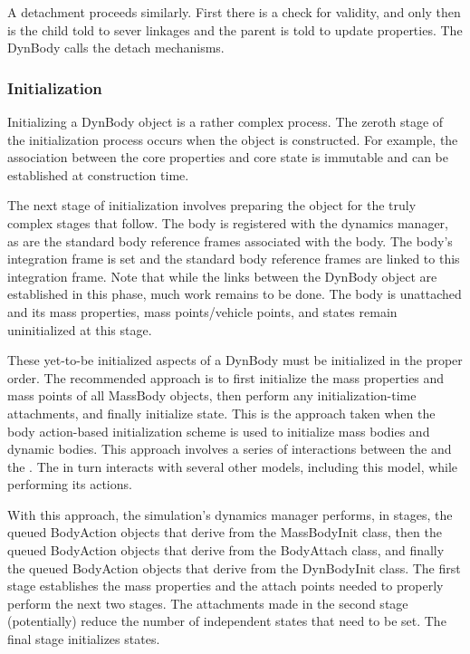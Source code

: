 A detachment proceeds similarly. First there is a check for validity,
and only then is the child told to sever linkages and the parent is told
to update properties. The DynBody calls the \MASS detach mechanisms.

\subsubsection{Initialization}\label{sec:key_initialization}
Initializing a DynBody object is a rather complex process. The zeroth stage
of the initialization process occurs when the object is constructed.
For example, the association between the core properties and core state is
immutable and can be established at construction time.

The next stage of initialization involves preparing the object for the truly
complex stages that follow. The body is registered with the dynamics manager,
as are the standard body reference frames associated with the body. The
body's integration frame is set and the standard body reference frames are
linked to this integration frame. Note that while the links between the
DynBody object are established in this phase, much work remains to be done.
The body is unattached and its mass properties, mass points/vehicle points, and
states remain uninitialized at this stage.

These yet-to-be initialized aspects of a DynBody must be initialized in the
proper order. The recommended approach is to first initialize the mass
properties and mass points of all MassBody objects, then perform any
initialization-time attachments, and finally initialize state. This is
the approach taken when the body action-based initialization scheme is used
to initialize mass bodies and dynamic bodies.
This approach involves a series of interactions
between the  and the .
The \BODYACTION in turn interacts with
several other models, including this model, while performing its actions.

With this approach, the simulation's dynamics manager performs, in stages,
the queued BodyAction objects that derive from the MassBodyInit class,
then the queued BodyAction objects that derive from the BodyAttach class,
and finally the queued BodyAction objects that derive from the DynBodyInit
class.
The first stage establishes the mass properties and the attach points needed to
properly perform the next two stages. The attachments made in the second stage
(potentially) reduce the number of independent states that need to be set.
The final stage initializes states.

